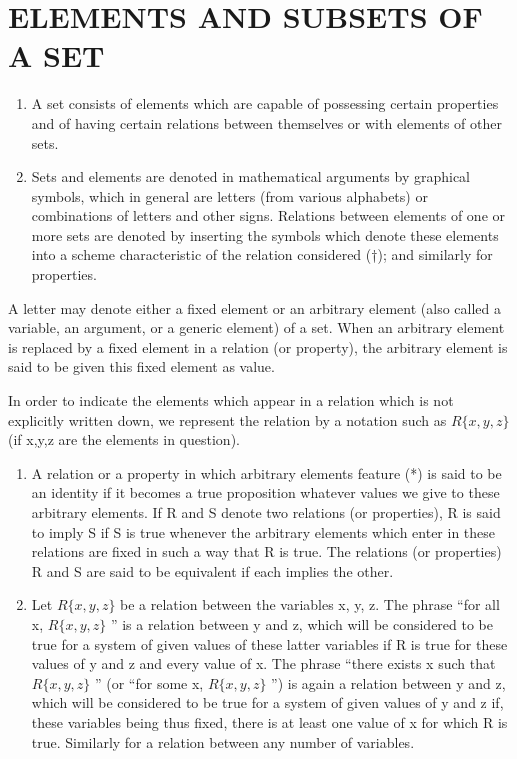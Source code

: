 \section{ELEMENTS AND SUBSETS OF A SET}

\begin{enumerate}
\def\labelenumi{\arabic{enumi}.}
\item
  A set consists of elements which are capable of possessing certain properties and of having certain relations between themselves or with elements of other sets.
\item
  Sets and elements are denoted in mathematical arguments by graphical symbols, which in general are letters (from various alphabets) or combinations of letters and other signs. Relations between elements of one or more sets are denoted by inserting the symbols which denote these elements into a scheme characteristic of the relation considered (†); and similarly for properties.
\end{enumerate}

A letter may denote either a fixed element or an arbitrary element (also called a variable, an argument, or a generic element) of a set. When an arbitrary element is replaced by a fixed element in a relation (or property), the arbitrary element is said to be given this fixed element as value.

In order to indicate the elements which appear in a relation which is not explicitly written down, we represent the relation by a notation such as \(R\{x,y,z\}\) (if x,y,z are the elements in question).

\begin{enumerate}
\def\labelenumi{\arabic{enumi}.}
\setcounter{enumi}{2}
\item
  A relation or a property in which arbitrary elements feature (*) is said to be an identity if it becomes a true proposition whatever values we give to these arbitrary elements. If R and S denote two relations (or properties), R is said to imply S if S is true whenever the arbitrary elements which enter in these relations are fixed in such a way that R is true. The relations (or properties) R and S are said to be equivalent if each implies the other.
\item
  Let \(R\{x, y, z\}\) be a relation between the variables x, y, z. The phrase ``for all x, \(R\{x, y, z\}\) '' is a relation between y and z, which will be considered to be true for a system of given values of these latter variables if R is true for these values of y and z and every value of x. The phrase ``there exists x such that \(R\{x, y, z\}\) '' (or ``for some x, \(R\{x, y, z\}\) '') is again a relation between y and z, which will be considered to be true for a system of given values of y and z if, these variables being thus fixed, there is at least one value of x for which R is true. Similarly for a relation between any number of variables.
\end{enumerate}


